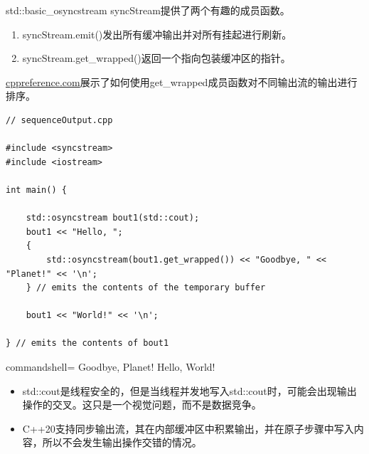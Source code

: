 std::basic\_osyncstream syncStream提供了两个有趣的成员函数。

\begin{enumerate}
\item 
syncStream.emit()发出所有缓冲输出并对所有挂起进行刷新。

\item 
syncStream.get\_wrapped()返回一个指向包装缓冲区的指针。
\end{enumerate}

\href{https://en.cppreference.com/w/cpp/io/basic_osyncstream/get_wrapped}{cppreference.com}展示了如何使用get\_wrapped成员函数对不同输出流的输出进行排序。

\begin{lstlisting}[style=styleCXX]
// sequenceOutput.cpp

#include <syncstream>
#include <iostream>

int main() {
	
	std::osyncstream bout1(std::cout);
	bout1 << "Hello, ";
	{
		std::osyncstream(bout1.get_wrapped()) << "Goodbye, " << "Planet!" << '\n';
	} // emits the contents of the temporary buffer

	bout1 << "World!" << '\n';
	
} // emits the contents of bout1
\end{lstlisting}

\begin{tcblisting}{commandshell={}}
Goodbye, Planet!
Hello, World!
\end{tcblisting}

\begin{tcolorbox}[breakable,enhanced jigsaw,colback=mygreen!5!white,colframe=mygreen!75!black,title={总结}]
	
\begin{itemize}
\item 
std::cout是线程安全的，但是当线程并发地写入std::cout时，可能会出现输出操作的交叉。这只是一个视觉问题，而不是数据竞争。

\item 
C++20支持同步输出流，其在内部缓冲区中积累输出，并在原子步骤中写入内容，所以不会发生输出操作交错的情况。
\end{itemize}
	
\end{tcolorbox}



